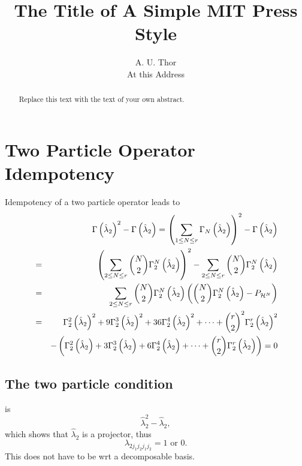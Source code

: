 \documentclass[12pt]{article}
\begin{document}
\title{The Title of A Simple MIT Press Style}
\author{A. U. Thor \\
At this Address}
\maketitle

\begin{abstract}
Replace this text with the text of your own abstract.
\end{abstract}

\section{Two Particle Operator Idempotency}

Idempotency of a two particle operator leads to 
\begin{eqnarray*}
&&\Gamma \left( \hat{\lambda}_{2}\right) ^{2}-\Gamma \left( \hat{\lambda}%
_{2}\right) =\left( \sum_{1\leq N\leq r}\Gamma _{N}\left( \hat{\lambda}%
_{2}\right) \right) ^{2}-\Gamma \left( \hat{\lambda}_{2}\right) \\
&=&\left( \sum_{2\leq N\leq r}\binom{N}{2}\Gamma _{2}^{N}\left( \hat{\lambda}%
_{2}\right) \right) ^{2}-\sum_{2\leq N\leq r}\binom{N}{2}\Gamma
_{2}^{N}\left( \hat{\lambda}_{2}\right) \\
&=&\sum_{2\leq N\leq r}\binom{N}{2}\Gamma _{2}^{N}\left( \hat{\lambda}%
_{2}\right) \left( \binom{N}{2}\Gamma _{2}^{N}\left( \hat{\lambda}%
_{2}\right) -P_{\mathcal{H}^{N}}\right) \\
&=&\quad \Gamma _{2}^{2}\left( \hat{\lambda}_{2}\right) ^{2}+9\Gamma
_{2}^{3}\left( \hat{\lambda}_{2}\right) ^{2}+36\Gamma _{2}^{4}\left( \hat{%
\lambda}_{2}\right) ^{2}+\cdots +\binom{r}{2}^{2}\Gamma _{2}^{r}\left( \hat{%
\lambda}_{2}\right) ^{2} \\
&&-\left( \Gamma _{2}^{2}\left( \hat{\lambda}_{2}\right) +3\Gamma
_{2}^{3}\left( \hat{\lambda}_{2}\right) +6\Gamma _{2}^{4}\left( \hat{\lambda}%
_{2}\right) +\cdots +\binom{r}{2}\Gamma _{2}^{r}\left( \hat{\lambda}%
_{2}\right) \right) =0
\end{eqnarray*}

\subsection{The two particle condition}

is 
\begin{equation*}
\hat{\lambda}_{2}^{2}-\hat{\lambda}_{2},
\end{equation*}%
which shows that $\hat{\lambda}_{2}$ is a projector, thus 
\begin{equation*}
\lambda _{2j_{1}j_{2}j_{1}j_{2}}=1\text{ or }0.
\end{equation*}%
This does not have to be wrt a decomposable basis. 
\end{document}
